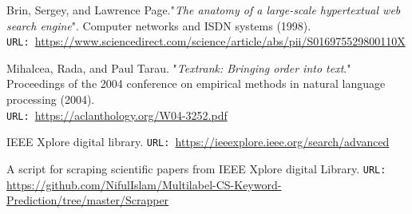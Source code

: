 \documentclass[12pt]{article}
\numberwithin{equation}{section}
\begin{document}
\begin{spacing}{1.5}
\begin{thebibliography}{8}
		Brin, Sergey, and Lawrence Page."\textit{The anatomy of a large-scale hypertextual web search engine}". Computer networks and ISDN systems (1998). \\
		\texttt{URL: }\url{https://www.sciencedirect.com/science/article/abs/pii/S016975529800110X}
		
		Mihalcea, Rada, and Paul Tarau. "\textit{Textrank: Bringing order into text}." Proceedings of the 2004 conference on empirical methods in natural language processing (2004). \\
		\texttt{URL: }\url{https://aclanthology.org/W04-3252.pdf}
		
		IEEE Xplore digital library.
		\texttt{URL: }\url{https://ieeexplore.ieee.org/search/advanced}
		
		A script for scraping scientific papers from IEEE Xplore digital Library.
		\texttt{URL: }\url{https://github.com/NifulIslam/Multilabel-CS-Keyword-Prediction/tree/master/Scrapper}
		
		
		
	\end{thebibliography}

	\end{spacing}
	
\end{document}

